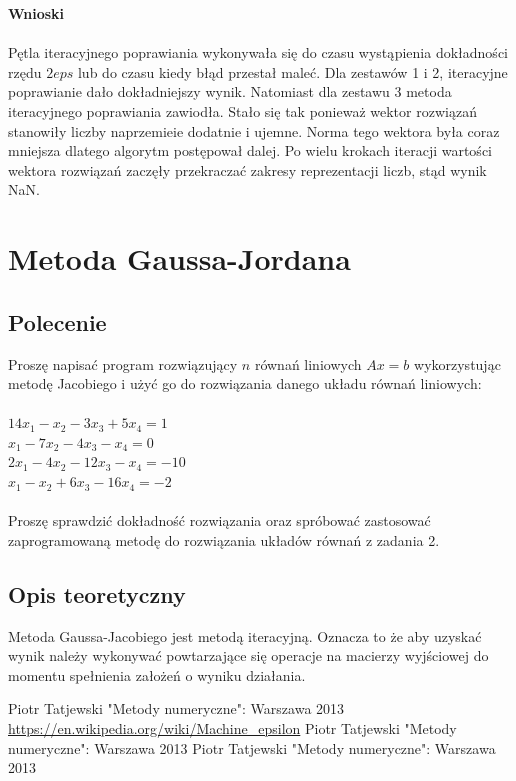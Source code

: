 \documentclass[a4paper, 11pt]{article}
\begin{document}
\vspace{2cm}
\textbf{Wnioski}\\
\\
Pętla iteracyjnego poprawiania wykonywała się do czasu wystąpienia dokładności rzędu $2eps$ lub do czasu kiedy błąd przestał maleć. Dla zestawów 1 i 2, iteracyjne poprawianie dało dokładniejszy wynik. Natomiast dla zestawu 3 metoda iteracyjnego poprawiania zawiodła. Stało się tak ponieważ wektor rozwiązań stanowiły liczby naprzemieie dodatnie i ujemne. Norma tego wektora była coraz mniejsza dlatego algorytm postępował dalej. Po wielu krokach iteracji wartości wektora rozwiązań zaczęły przekraczać zakresy reprezentacji liczb, stąd wynik NaN. 

\section{Metoda Gaussa-Jordana}
\subsection{Polecenie}
Proszę napisać program rozwiązujący $n$ równań liniowych $Ax=b$ wykorzystując metodę Jacobiego i użyć go do rozwiązania danego układu równań liniowych:\\
\\
$14x_{1}-x_{2} -3x_{3}+5x_{4} = 1$\\
$x_{1}-7x_{2} -4x_{3}-x_{4} = 0$\\
$2x_{1}-4x_{2} -12x_{3}-x_{4} =-10$\\
$x_{1}-x_{2}+6x_{3}-16x_{4} = -2$\\
\\
Proszę sprawdzić dokładność rozwiązania oraz spróbować zastosować zaprogramowaną metodę do rozwiązania układów równań z zadania 2. 

\subsection{Opis teoretyczny}
Metoda Gaussa-Jacobiego jest metodą iteracyjną. Oznacza to że aby uzyskać wynik należy wykonywać powtarzające się operacje na macierzy wyjściowej do momentu spełnienia założeń o wyniku działania.







\begin{thebibliography}{99}
 Piotr Tatjewski "Metody numeryczne":
Warszawa 2013
\url{https://en.wikipedia.org/wiki/Machine_epsilon}
 Piotr Tatjewski "Metody numeryczne":
Warszawa 2013
 Piotr Tatjewski "Metody numeryczne":
Warszawa 2013
\end{thebibliography}










	
\end{document}
